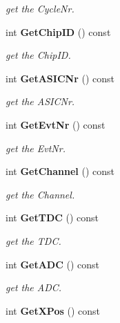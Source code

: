 \begin{DoxyCompactItemize}
\begin{DoxyCompactList}\small\item\em get the CycleNr. \item\end{DoxyCompactList}\item 
int {\bf GetChipID} () const \label{classCALICE_1_1LabviewBlock_a5c14f61678c97e36a4c63717055175b3}

\begin{DoxyCompactList}\small\item\em get the ChipID. \item\end{DoxyCompactList}\item 
int {\bf GetASICNr} () const \label{classCALICE_1_1LabviewBlock_a20b34eb84745f2fb035daebcec6c8eb8}

\begin{DoxyCompactList}\small\item\em get the ASICNr. \item\end{DoxyCompactList}\item 
int {\bf GetEvtNr} () const \label{classCALICE_1_1LabviewBlock_a15229cd3b6b44ef7fcabb3d7f8b7cbf4}

\begin{DoxyCompactList}\small\item\em get the EvtNr. \item\end{DoxyCompactList}\item 
int {\bf GetChannel} () const \label{classCALICE_1_1LabviewBlock_a56f8ebcbbff0a314b7b647900e677549}

\begin{DoxyCompactList}\small\item\em get the Channel. \item\end{DoxyCompactList}\item 
int {\bf GetTDC} () const \label{classCALICE_1_1LabviewBlock_aabb31d4cb06168df0acd5126b05ad801}

\begin{DoxyCompactList}\small\item\em get the TDC. \item\end{DoxyCompactList}\item 
int {\bf GetADC} () const \label{classCALICE_1_1LabviewBlock_a1f4937a4b2e883ecf0364b7369cd3708}

\begin{DoxyCompactList}\small\item\em get the ADC. \item\end{DoxyCompactList}\item 
int {\bf GetXPos} () const \label{classCALICE_1_1LabviewBlock_aeb75ea8ea414ef184e30d8c6a967a5f6}


\end{DoxyCompactItemize}
